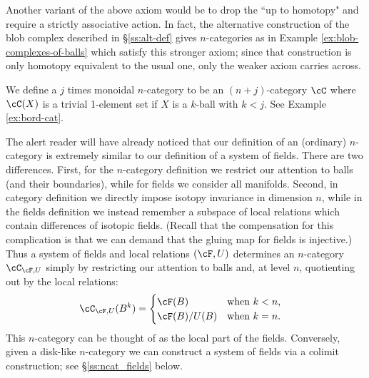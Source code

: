Another variant of the above axiom would be to drop the ``up to homotopy" and require a strictly associative action. 
In fact, the alternative construction of the blob complex described in \S \ref{ss:alt-def} 
gives $n$-categories as in Example \ref{ex:blob-complexes-of-balls} which satisfy this stronger axiom; 
since that construction is only homotopy equivalent to the usual one, only the weaker axiom carries across.



\medskip

We define a $j$ times monoidal $n$-category to be an $(n{+}j)$-category $\cC$ where
$\cC(X)$ is a trivial 1-element set if $X$ is a $k$-ball with $k<j$.
See Example \ref{ex:bord-cat}.

\medskip

The alert reader will have already noticed that our definition of an (ordinary) $n$-category
is extremely similar to our definition of a system of fields.
There are two differences.
First, for the $n$-category definition we restrict our attention to balls
(and their boundaries), while for fields we consider all manifolds.
Second,  in category definition we directly impose isotopy
invariance in dimension $n$, while in the fields definition we 
instead remember a subspace of local relations which contain differences of isotopic fields. 
(Recall that the compensation for this complication is that we can demand that the gluing map for fields is injective.)
Thus a system of fields and local relations $(\cF,U)$ determines an $n$-category $\cC_ {\cF,U}$ simply by restricting our attention to
balls and, at level $n$, quotienting out by the local relations:
\begin{align*}
\cC_{\cF,U}(B^k) & = \begin{cases}\cF(B) & \text{when $k<n$,} \\ \cF(B) / U(B) & \text{when $k=n$.}\end{cases}
\end{align*}
This $n$-category can be thought of as the local part of the fields.
Conversely, given a disk-like $n$-category we can construct a system of fields via 
a colimit construction; see \S \ref{ss:ncat_fields} below.

